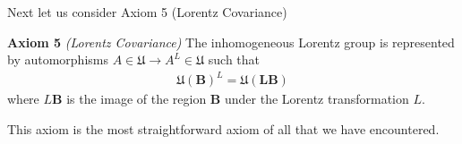 Next let us consider Axiom 5 (Lorentz Covariance)

\textbf{Axiom 5} \textit{(Lorentz Covariance)} The inhomogeneous Lorentz group is represented by automorphisms $A \in \mathfrak{U} \rightarrow A^L \in \mathfrak{U}$ such that
\begin{align}
    \mathfrak{U}(\mathbf{B})^L = \mathfrak{U}(\mathbf{LB})
\end{align}
where $L\mathbf{B}$ is the image of the region $\mathbf{B}$ under the Lorentz transformation $L$. 

This axiom is the most straightforward axiom of all that we have encountered.
